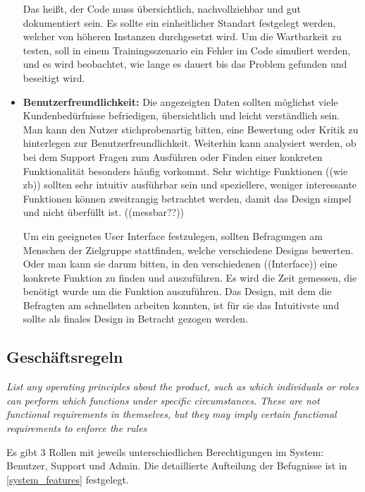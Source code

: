\begin{itemize}
    Das heißt, der Code muss übersichtlich, nachvollziehbar und gut dokumentiert sein. 
    Es sollte ein einheitlicher Standart festgelegt werden, welcher von höheren Instanzen durchgesetzt wird. 
    Um die Wartbarkeit zu testen, soll in einem Trainingsszenario ein Fehler im Code simuliert werden, 
    und es wird beobachtet, wie lange es dauert bis das Problem gefunden und beseitigt wird. 
    

    \item \textbf{Benutzerfreundlichkeit: }
    Die angezeigten Daten sollten möglichst viele Kundenbedürfnisse 
    befriedigen, übersichtlich und leicht verständlich sein.
    Man kann den Nutzer stichprobenartig bitten, eine Bewertung oder Kritik zu hinterlegen zur Benutzerfreundlichkeit. 
    Weiterhin kann analysiert werden, ob bei dem Support Fragen zum Ausführen oder Finden einer konkreten Funktionalität besonders häufig vorkommt.
    Sehr wichtige Funktionen ((wie zb)) sollten sehr intuitiv ausführbar sein und speziellere, weniger interessante Funktionen können zweitrangig 
    betrachtet werden, damit das Design simpel und nicht überfüllt ist.
    ((messbar??))
    
    Um ein geeignetes User Interface festzulegen, sollten Befragungen am Menschen der Zielgruppe stattfinden,
    welche verschiedene Designs bewerten.
    Oder man kann sie darum bitten, in den verschiedenen ((Interface)) eine konkrete Funktion zu finden und auszuführen.
    Es wird die Zeit gemessen, die benötigt wurde um die Funktion auszuführen.
    Das Design, mit dem die Befragten am schnellsten arbeiten konnten, ist für sie das Intuitivste und sollte als finales Design in Betracht gezogen werden. 
    
   
\end{itemize}

\subsection{Geschäftsregeln}
\textit{List any operating principles about the product, 
such as which individuals or roles can perform which functions under specific circumstances. 
These are not functional requirements in themselves, 
but they may imply certain functional requirements to enforce the rules}

    Es gibt 3 Rollen mit jeweils unterschiedlichen Berechtigungen im System: Benutzer, Support und Admin. Die detaillierte Aufteilung der Befugnisse ist in \ref{system_features} festgelegt.

